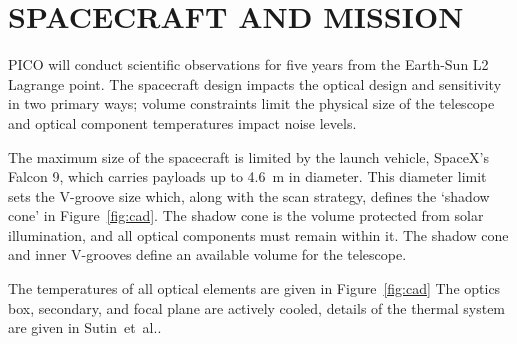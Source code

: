 \documentclass[]{spie}  %
\newcommand{\comb}[1]{\textcolor{blue}{#1}}
\begin{document}

\section{SPACECRAFT AND MISSION}
\label{sec:spacecraft}


PICO will conduct scientific observations for five years from the Earth-Sun L2 Lagrange point. The spacecraft design impacts 
the optical design and sensitivity in two primary ways; volume constraints limit the physical size of the telescope and optical component 
temperatures impact noise levels.  

The maximum size of the spacecraft is limited by the launch vehicle, SpaceX's Falcon 9, which carries payloads up to 4.6~m in diameter. 
This diameter limit sets the V-groove size which, along with the scan strategy, defines the `shadow cone' in Figure~\ref{fig:cad}.  
The shadow cone is the volume protected from solar illumination, and all optical components must remain within it. The shadow cone and 
inner V-grooves define an available volume for the telescope.  

The temperatures of all optical elements are given in Figure~\ref{fig:cad} 
The optics box, secondary, and focal plane are actively cooled, 
details of the thermal system are given in Sutin~et~al.\cite{brian_spie}. 
\end{document}

